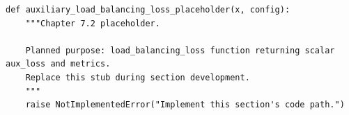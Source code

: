 \begin{lstlisting}[style=bookpython,caption={Planned code placeholder for auxiliary load balancing loss.},label={lst:ch07-auxiliary-load-balancing-loss}]
def auxiliary_load_balancing_loss_placeholder(x, config):
    """Chapter 7.2 placeholder.

    Planned purpose: load_balancing_loss function returning scalar aux_loss and metrics.
    Replace this stub during section development.
    """
    raise NotImplementedError("Implement this section's code path.")
\end{lstlisting}
